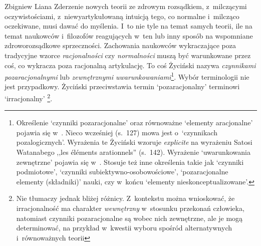 \begin{artplenv}{Zbigniew Liana}
Zderzenie nowych teorii ze zdrowym rozsądkiem, z~milczącymi oczywistościami, z~niewyartykułowaną intuicją tego, co
normalne i~milcząco oczekiwane, musi dawać do myślenia. I~to nie tyle na temat samych teorii, ile na temat naukowców i~filozofów
reagujących w~ten lub inny sposób na wspomniane zdroworozsądkowe sprzeczności. Zachowania naukowców
wykraczające poza tradycyjne wzorce \textit{racjonalności} czy \textit{normalności} muszą być warunkowane przez coś, co
wykracza poza racjonalną artykulację. To coś Życiński nazywa \textit{czynnikami pozaracjonalnymi} lub \textit{zewnętrznymi
uwarunkowaniami}\footnote{Określenie `czynniki pozaracjonalne' oraz równoważne `elementy aracjonalne' pojawia
się
w~\parencite[s.~142]{zycinski_jezyk_1983}.
Nieco wcześniej
(s.~127)
mowa jest o~`czynnikach pozalogicznych'. Wyrażenia te Życiński
wzoruje \textit{explicite} na wyrażeniu Satosi Watanabego ,,les éléments arationnels''
(s.~142).
Wyrażenie `uwarunkowania zewnętrzne' pojawia się
w~\parencites[s.~130]{zycinski_structure_1988}[s.~230]{zycinski_struktura_2013}.
Stosuje też inne określenia takie jak `czynniki
podmiotowe', `czynniki subiektywno-osobowościowe', `pozaracjonalne elementy\textit{ }(składniki)' nauki, czy w~końcu
`elementy nieskonceptualizowane'.}. Wybór terminologii nie jest przypadkowy. Życiński przeciwstawia termin
`pozaracjonalny' terminowi `irracjonalny' 
\parencites[zob.][s.~137]{zycinski_structure_1988}[s.~242]{zycinski_struktura_2013}\footnote{%
Nie tłumaczy jednak bliżej różnicy. Z~kontekstu można wnioskować, że irracjonalność ma charakter
\textit{wewnętrzny} w~stosunku przekonań człowieka, natomiast czynniki pozaracjonalne są wobec nich zewnętrzne, ale je mogą determinować,
na przykład w~kwestii wyboru spośród alternatywnych i~równoważnych teorii}.


\end{artplenv}
